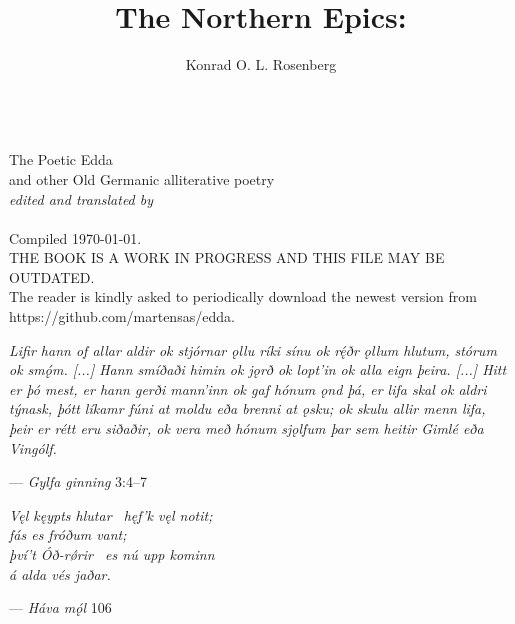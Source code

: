 \title{The Northern Epics:}
\author{Konrad O. L. Rosenberg}

\begin{titlingpage}
  \makeatletter
  \centering
  \HUGE \textsc{\@title} \\
  \Huge The Poetic Edda \\
  \huge and other Old Germanic alliterative poetry \\
  \vspace{1cm}
  \Large\emph{edited and translated by} \\
  \vspace{1cm}
  \huge \@author \\
  \vspace{4cm}
  \Large Compiled \today. \\
  \vspace{1cm}
  THE BOOK IS A WORK IN PROGRESS AND THIS FILE MAY BE OUTDATED. \\
  The reader is kindly asked to periodically download the newest version from https://github.com/martensas/edda.
  \makeatother
\end{titlingpage}

\newpage\thispagestyle{empty}

\vspace*{\fill}

\begin{center}{\Large \emph{Lifir hann of allar aldir ok stjórnar ǫllu ríki sínu ok rę́ðr ǫllum hlutum, stórum ok smǫ́m. [...] Hann smíðaði himin ok jǫrð ok lopt’in ok alla eign þeira. [...] Hitt er þó mest, er hann gerði mann’inn ok gaf hónum ǫnd þá, er lifa skal ok aldri týnask, þótt líkamr fúni at moldu eða brenni at ǫsku; ok skulu allir menn lifa, þeir er rétt eru siðaðir, ok vera með hónum sjǫlfum þar sem heitir Gimlé eða Vingólf.}}\end{center}
\begin{flushright}%
— \emph{Gylfa ginning} 3:4–7%
\end{flushright}

\vspace{5mm}

\begin{center}{\Large \emph{Vęl kęypts hlutar \hld\ hęf’k vęl notit; \\
fás es fróðum vant; \\
því’t Óð-rǿrir \hld\ es nú upp kominn \\
á alda vés jaðar.}}\end{center}

\begin{flushright}%
— \emph{Háva mǫ́l} 106%
\end{flushright}

